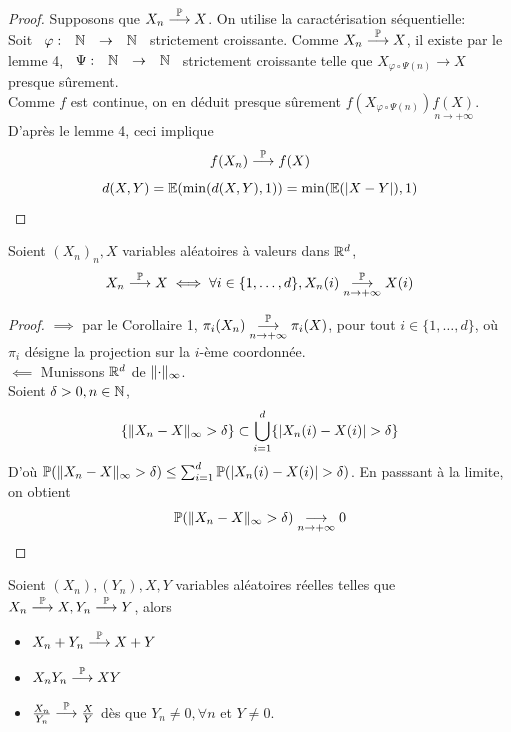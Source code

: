 \documentclass[]{report}
\begin{document}
    \begin{proof}
        Supposons que $X_n\overset{\mathbb{P}}{\longrightarrow}X$. On utilise la caractérisation séquentielle:\\
        Soit $\begin{array}{ccccc} \varphi : & \mathbb{N} & \to & \mathbb{N} \end{array}$ strictement croissante. Comme $X_n\overset{\mathbb{P}}{\longrightarrow}X$, il existe par le lemme 4, $\begin{array}{ccccc} \Psi : & \mathbb{N} & \to & \mathbb{N} \end{array}$ strictement croissante telle que $X_{\varphi\circ \Psi(n)}\longrightarrow X$ presque sûrement.\\
        Comme $f$ est continue, on en déduit presque sûrement $f(X_{\varphi\circ \Psi(n)})\underset{n\to +\infty}{f(X)}$. D'après le lemme 4, ceci implique
        \[f(X_n)\overset{\mathbb{P}}{\longrightarrow}f(X)\]
        \[d(X,Y)=\mathbb{E}(\min(d(X,Y),1))=\min(\mathbb{E}(|X-Y|),1)\]
    \end{proof}

    \begin{lm}{}{}
        Soient $(X_n)_n, X$ variables aléatoires à valeurs dans $\mathbb{R}^d$,
        \[X_n\overset{\Pa}{\longrightarrow}X\iff \forall i\in \{1,\ldots,d\},X_n(i)\overunderset{\Pa}{n\to +\infty}{\longrightarrow}X(i)\]
    \end{lm}

    \begin{proof}
        $\implies$ par le Corollaire 1, $\pi_i(X_n)\overunderset{\Pa}{n\to +\infty}{\longrightarrow}\pi_i(X)$, pour tout $i\in \{1,\ldots,d\}$, où $\pi_i$ désigne la projection sur la $i$-ème coordonnée.\\
        $\impliedby$ Munissons $\mathbb{R}^d$ de $\lVert \cdot \rVert_\infty$.\\
        Soient $\delta >0,n\in \mathbb{N}$,
        \[\{\norme{X_n-X}_\infty >\delta\}\subset \bigcup_{i=1}^d\{|X_n(i)-X(i)|>\delta\}\]
        D'où $\Pa(\norme{X_n-X}_\infty>\delta)\le \sum_{i=1}^{d}\Pa(|X_n(i)-X(i)|>\delta)$. En passsant à la limite, on obtient
        \[\mathbb{P}(\lVert X_n-X \rVert_{\infty}>\delta)\underset{n\to +\infty}{\longrightarrow} 0\]
    \end{proof}

    \begin{lm}{}{}
        Soient $(X_n),(Y_n),X,Y$ variables aléatoires réelles telles que $X_n\overset{\mathbb{P}}{\longrightarrow}X,Y_n\overset{\mathbb{P}}{\longrightarrow}Y$, alors
        \begin{itemize}
            \item $X_n+Y_n\overset{\mathbb{P}}{\longrightarrow}X+Y$
            \item $X_nY_n\overset{\mathbb{P}}{\longrightarrow}XY$
            \item $\frac{X_n}{Y_n}\overset{\mathbb{P}}{\longrightarrow}\frac{X}{Y}$ dès que $Y_n\neq 0,\forall n$ et $Y\neq 0$.
        \end{itemize}
    \end{lm}
\end{document}
